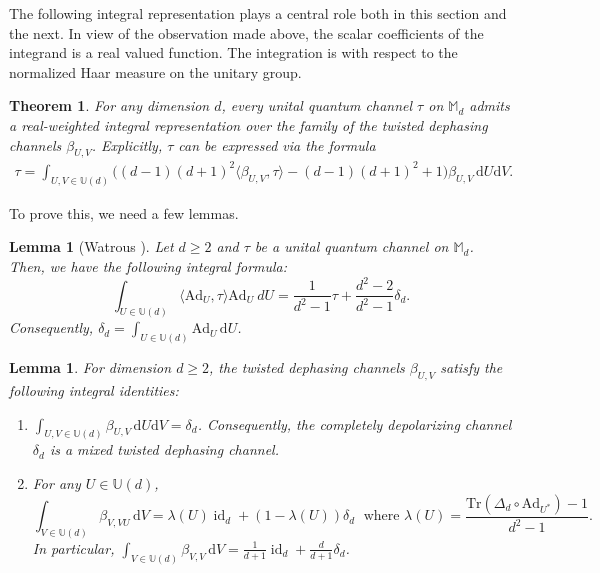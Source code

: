 \documentclass[11pt,reqno]{amsart}
\theoremstyle{definition}
\theoremstyle{plain}
\newtheorem{thm}[defn]{Theorem}
\newtheorem{lem}[defn]{Lemma}
\theoremstyle{remark}
\newcommand{\ra}{\rangle}
\numberwithin{equation}{section}%
\begin{document}
The following integral representation plays a central role  both in this section and the next. In view of the observation made above, the scalar coefficients of the integrand is a real valued function. The integration is with respect to the normalized Haar measure on the unitary group.

\begin{thm}\label{EMD:thm3}
	For any dimension $d$, every unital quantum channel $\tau$ on $\mathbb{M}_d$ admits a real-weighted integral representation over the family of the twisted dephasing channels $\beta_{U,V}$. Explicitly, $\tau$ can be expressed via the formula
	\begin{align}\label{EMD:eq1}
		\tau = \int_{U,V \in \mathbb{U}(d)} \Big( (d-1)(d+1)^2 \langle \beta_{U,V}, \tau \rangle - (d-1)(d+1)^2 + 1 \Big) \beta_{U,V} \, \mathrm{d}U \mathrm{d}V.
	\end{align}
\end{thm}




To prove this, we need a few lemmas.


  \begin{lem}[Watrous \cite{JW2}]\label{EMD:lem7}
	Let $d\geq 2$ and $\tau$ be a unital quantum channel on $\mathbb{M}_d$. Then, we have the following integral formula:
	\[\int_{U\in \mathbb{U}(d)}\langle\text{Ad}_U,\tau\ra\text{Ad}_U\ dU=\frac{1}{d^2-1}\tau+\frac{d^2-2}{d^2-1}\delta_d.\]
	Consequently, $\delta_d=\int_{U\in \mathbb{U}(d)}\text{Ad}_U\, \mathrm{d}U$.
\end{lem}



  \begin{lem}\label{EMD:lem2}
	For dimension $d\ge 2$, the twisted dephasing channels $\beta_{U,V}$ satisfy the following integral identities:
	\begin{enumerate}
		\item $\int_{U,V \in \mathbb{U}(d)} \beta_{U,V} \, \mathrm{d}U \mathrm{d}V = \delta_d$. Consequently, the completely depolarizing channel $\delta_d$ is  a mixed twisted dephasing channel.
		\item For any $U\in \mathbb{U}(d)$, 
		\[\int_{V\in \mathbb{U}(d)}\beta_{V,VU}\,\mathrm{d}V=\lambda(U)\operatorname{id}_d+(1-\lambda(U))\delta_d\;\text{ where }\lambda(U)=\frac{\text{Tr}(\Delta_d\circ\text{Ad}_{U^*})-1}{d^2-1}.\] In particular, $\int_{V \in \mathbb{U}(d)} \beta_{V,V} \, \mathrm{d}V = \frac{1}{d+1}\operatorname{id}_d + \frac{d}{d+1}\delta_d$.
	\end{enumerate}
\end{lem}
\end{document}
